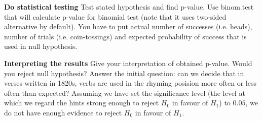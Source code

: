 \begin{ExerciseList}
\begin{knitrout}
\begin{kframe}
{\ttfamily\noindent\bfseries{}}\end{kframe}
\end{knitrout}
	\Question \textbf{ Do statistical testing}
	Test stated hypothesis and find p-value. Use binom.test that will calculate p-value for binomial test (note that it uses two-sided alternative by default). You have to put actual number of successes (i.e. heads), number of trials (i.e. coin-tossings) and expected probability of success that is used in null hypothesis.
\begin{knitrout}
\color{fgcolor}
\end{knitrout}
	\Question \textbf{Interpreting the results}	Give your interpretation of obtained p-value. Would you reject null hypothesis? Answer the initial question: can we decide that in verses written in 1820s, verbs are used in the rhyming posision more often or less often than expected?
	Assuming we have set the significance level (the level at which we regard the hints strong enough to reject $H_0$ in favour of $H_1$) to $0.05$, we do not have enough evidence to reject $H_0$ in favour of $H_1$.
\end{ExerciseList}
	
